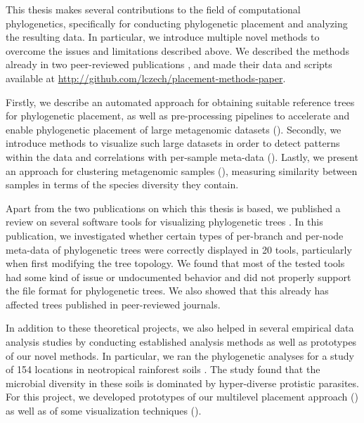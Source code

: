 This thesis makes several contributions to the field of computational phylogenetics,
specifically for conducting phylogenetic placement and analyzing the resulting data.
In particular, we introduce multiple novel methods to overcome the issues and limitations described above.
We described the methods already in two peer-reviewed publications \cite{Czech2018,Czech2018a},
and made their data and scripts available at \url{http://github.com/lczech/placement-methods-paper}.

Firstly, we describe an automated approach for obtaining suitable reference trees for phylogenetic placement,
as well as pre-processing pipelines to accelerate and enable
phylogenetic placement of large metagenomic datasets ().
Secondly, we introduce methods to visualize such large datasets
in order to detect patterns within the data and correlations with per-sample meta-data ().
Lastly, we present an approach for clustering metagenomic samples (),
measuring similarity between samples in terms of the species diversity they contain.

Apart from the two publications on which this thesis is based,
we published a review on several software tools for visualizing phylogenetic trees \cite{Czech2017}.
In this publication, we investigated whether certain types of per-branch and per-node meta-data of phylogenetic trees
were correctly displayed in \num{20} tools, particularly when first modifying the tree topology.
We found that most of the tested tools had some kind of issue or undocumented behavior and
did not properly support the  file format for phylogenetic trees.
We also showed that this already has affected trees published in peer-reviewed journals.

In addition to these theoretical projects, we also helped in several empirical data analysis studies
by conducting established analysis methods as well as prototypes of our novel methods.
In particular, we ran the phylogenetic analyses for a study of \num{154} locations
in neotropical rainforest soils \cite{Mahe2017}. 
The study found that the microbial diversity in these soils is dominated by hyper-diverse protistic parasites.
For this project, we developed prototypes of our multilevel placement approach
()
as well as of some visualization techniques ().

